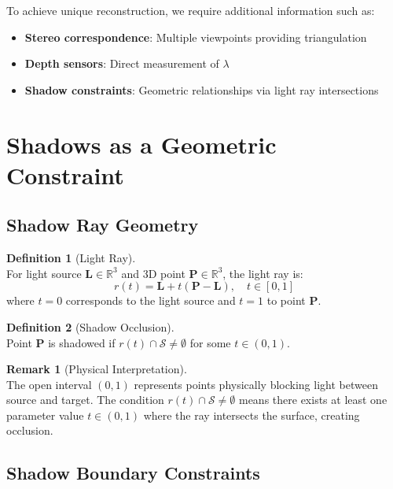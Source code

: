 \documentclass[12pt]{article}
\theoremstyle{definition}
\newtheorem{definition}{Definition}[section]
\newtheorem{remark}{Remark}[section]
\begin{document}
To achieve unique reconstruction, we require additional information such as:
\begin{itemize}
    \item \textbf{Stereo correspondence}: Multiple viewpoints providing triangulation
    \item \textbf{Depth sensors}: Direct measurement of $\lambda$
    \item \textbf{Shadow constraints}: Geometric relationships via light ray intersections
\end{itemize}

\section{Shadows as a Geometric Constraint}

\subsection{Shadow Ray Geometry}

\begin{definition}[Light Ray] ~\\
For light source $\mathbf{L} \in \mathbb{R}^3$ and 3D point $\mathbf{P} \in \mathbb{R}^3$, the light ray is:
\begin{equation}
\boxed{r(t) = \mathbf{L} + t(\mathbf{P} - \mathbf{L}), \quad t \in [0,1]} \label{eq:light_ray}
\end{equation}
where $t=0$ corresponds to the light source and $t=1$ to point $\mathbf{P}$.
\end{definition}

\begin{definition}[Shadow Occlusion] ~\\
Point $\mathbf{P}$ is shadowed if $r(t) \cap \mathcal{S} \neq \emptyset$ for some $t \in (0,1)$.
\end{definition}

\begin{remark}[Physical Interpretation] ~\\
The open interval $(0,1)$ represents points physically blocking light between source and target. The condition $r(t) \cap \mathcal{S} \neq \emptyset$ means there exists at least one parameter value $t \in (0,1)$ where the ray intersects the surface, creating occlusion.
\end{remark}

\subsection{Shadow Boundary Constraints}
\end{document}
